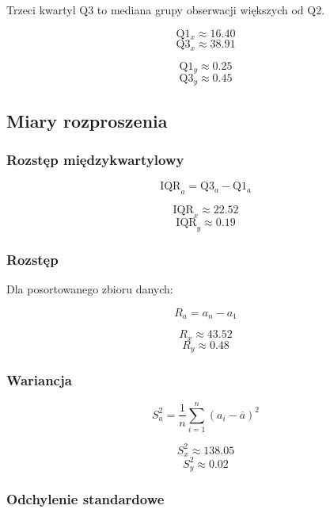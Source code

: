 \documentclass[fleqn]{article}
\begin{document}
    \noindent Trzeci kwartyl $\text{Q}3$ to mediana grupy obserwacji większych od $\text{Q}2$.


    $$\text{Q}1_{x} \approx 16.40$$
    $$\text{Q}3_{x} \approx 38.91$$

    $$\text{Q}1_{y} \approx 0.25$$
    $$\text{Q}3_{y} \approx 0.45$$


    \subsection{Miary rozproszenia}


    \subsubsection{Rozstęp międzykwartylowy}

    $$\text{IQR}_a = \text{Q}3_a - \text{Q}1_a$$ 
    

    $$\text{IQR}_{x} \approx 22.52$$
    $$\text{IQR}_{y} \approx 0.19$$
    


    \subsubsection{Rozstęp}

    Dla posortowanego zbioru danych:

    $$R_a = a_n - a_1$$ 
    

    $$R_{x} \approx 43.52$$
    $$R_{y} \approx 0.48$$

    \subsubsection{Wariancja}

    $$S_a^2 = \frac{1}{n} \sum_{i=1}^n\left(a_i - \overline{a}\right)^2$$ 
    

    $$S^2_{x} \approx 138.05$$
    $$S^2_{y} \approx 0.02$$

    \subsubsection{Odchylenie standardowe}
\end{document}
